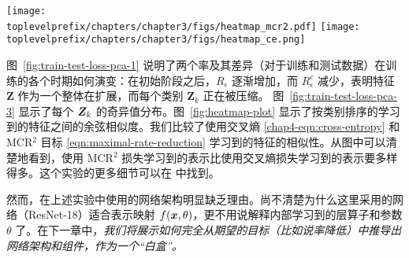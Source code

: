 \documentclass[../../book-main_zh.tex]{subfiles}
\begin{document}
\begin{example}
	\begin{figure*}[b]
		\begin{center}

			\texttt{[image: \\toplevelprefix/chapters/chapter3/figs/heatmap\_mcr2.pdf]}
			\hspace{0.25cm}
			\texttt{[image: \\toplevelprefix/chapters/chapter3/figs/heatmap\_ce.png]}
			\caption{\small 使用 MCR$^2$ 目标（\textbf{左}）和 CE 损失（\textbf{右}）学习到的特征之间的余弦相似度。}
			\label{fig:heatmap-plot}
		\end{center}
		\vskip -0.1in
	\end{figure*}

	图~\ref{fig:train-test-loss-pca-1} 说明了两个率及其差异（对于训练和测试数据）在训练的各个时期如何演变：在初始阶段之后，$R_\epsilon$ 逐渐增加，而 $R^c_\epsilon$ 减少，表明特征 $\bm Z$ 作为一个整体在扩展，而每个类别 $\bm Z_k$ 正在被压缩。
	图~\ref{fig:train-test-loss-pca-3} 显示了每个 $\bm{Z}_k$ 的奇异值分布。图~\ref{fig:heatmap-plot} 显示了按类别排序的学习到的特征之间的余弦相似度。我们比较了使用交叉熵 \eqref{chap4-eqn:cross-entropy} 和 MCR$^2$ 目标 \eqref{eqn:maximal-rate-reduction} 学习到的特征的相似性。从图中可以清楚地看到，使用 MCR$^2$ 损失学习到的表示比使用交叉熵损失学习到的表示要多样得多。这个实验的更多细节可以在 \cite{chan2021redunet} 中找到。
	\label{eg:Rate-Reduction-CIFAR10}
\end{example}


然而，在上述实验中使用的网络架构明显缺乏理由。尚不清楚为什么这里采用的网络（ResNet-18）适合表示映射 $f(\bm{x}, \theta)$，更不用说解释内部学习到的层算子和参数 $\theta$ 了。在下一章中，{\em 我们将展示如何完全从期望的目标（比如说率降低）中推导出网络架构和组件，作为一个“白盒”。}
\end{document}
